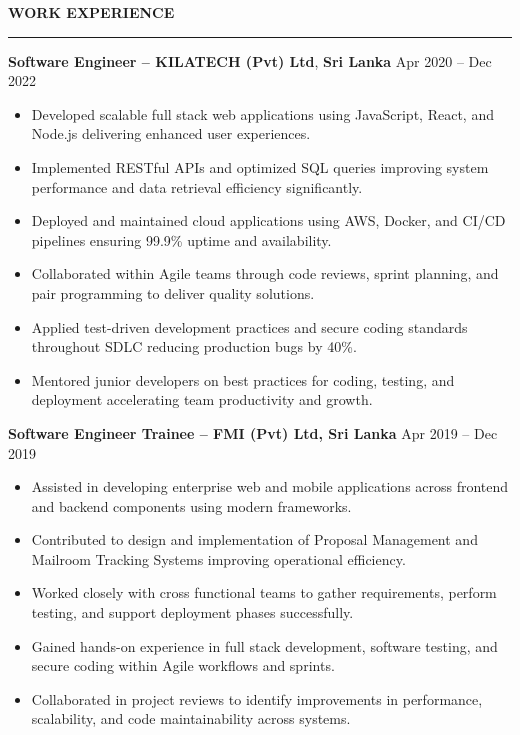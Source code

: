 \documentclass[10pt,letterpaper]{article}
\begin{document}
\vspace{8pt}

\textbf{WORK EXPERIENCE}\\[-8pt]
\noindent\rule{\textwidth}{1pt}

\vspace{-2pt}

\textbf{Software Engineer -- KILATECH (Pvt) Ltd}, \textbf{Sri Lanka} \hfill Apr 2020 -- Dec 2022

\vspace{-1pt}

\begin{itemize}
\item Developed scalable full stack web applications using JavaScript, React, and Node.js delivering enhanced user experiences.
\item Implemented RESTful APIs and optimized SQL queries improving system performance and data retrieval efficiency significantly.
\item Deployed and maintained cloud applications using AWS, Docker, and CI/CD pipelines ensuring 99.9\% uptime and availability.
\item Collaborated within Agile teams through code reviews, sprint planning, and pair programming to deliver quality solutions.
\item Applied test-driven development practices and secure coding standards throughout SDLC reducing production bugs by 40\%.
\item Mentored junior developers on best practices for coding, testing, and deployment accelerating team productivity and growth.
\end{itemize}

\textbf{Software Engineer Trainee -- FMI (Pvt) Ltd, Sri Lanka} \hfill Apr 2019 -- Dec 2019

\vspace{-1pt}

\begin{itemize}
\item Assisted in developing enterprise web and mobile applications across frontend and backend components using modern frameworks.
\item Contributed to design and implementation of Proposal Management and Mailroom Tracking Systems improving operational efficiency.
\item Worked closely with cross functional teams to gather requirements, perform testing, and support deployment phases successfully.
\item Gained hands-on experience in full stack development, software testing, and secure coding within Agile workflows and sprints.
\item Collaborated in project reviews to identify improvements in performance, scalability, and code maintainability across systems.
\end{itemize}
\end{document}
